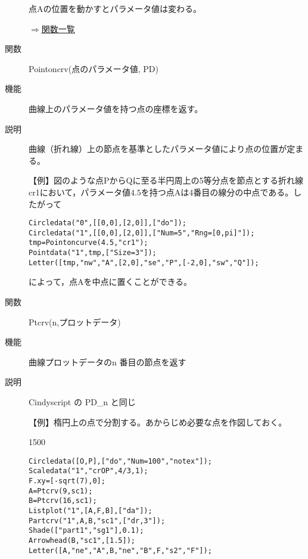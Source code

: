 \documentclass[papersize,a4paper,10pt,uplatex]{jsarticle}
\begin{document}
\begin{description}
点Aの位置を動かすとパラメータ値は変わる。

\vspace{\baselineskip}
\begin{center}
 
\end{center}

\begin{flushright}\hyperlink{functionlist}{$\Rightarrow$関数一覧}\end{flushright}


\vspace{\baselineskip}
\hypertarget{pointoncrv}{}
\item[関数]Pointoncrv(点のパラメータ値, PD)
\item[機能]曲線上のパラメータ値を持つ点の座標を返す。
\item[説明]曲線（折れ線）上の節点を基準としたパラメータ値により点の位置が定まる。

\vspace{\baselineskip}
【例】図のような点$\mathrm{P}$から$\mathrm{Q}$に至る半円周上の5等分点を節点とする折れ線cr1において，パラメータ値$4.5$を持つ点$\mathrm{A}$は4番目の線分の中点である。したがって

\begin{verbatim}
Circledata("0",[[0,0],[2,0]],["do"]);
Circledata("1",[[0,0],[2,0]],["Num=5","Rng=[0,pi]"]);
tmp=Pointoncurve(4.5,"cr1");
Pointdata("1",tmp,["Size=3"]);
Letter([tmp,"nw","A",[2,0],"se","P",[-2,0],"sw","Q"]);
\end{verbatim}

によって，点Aを中点に置くことができる。

\vspace{\baselineskip}
 \begin{center} \scalebox{0.9}{} \end{center}

\hypertarget{ptcrv}{}
\item[関数]Ptcrv(n,プロットデータ)
\item[機能]曲線プロットデータのn 番目の節点を返す
\item[説明]Cindyscript の PD\_n と同じ

\vspace{\baselineskip}
【例】楕円上の点で分割する。あからじめ必要な点を作図しておく。

\begin{layer}{150}{0}
\end{layer}
\begin{verbatim}
Circledata([O,P],["do","Num=100","notex"]);
Scaledata("1","crOP",4/3,1);
F.xy=[-sqrt(7),0];
A=Ptcrv(9,sc1);
B=Ptcrv(16,sc1);
Listplot("1",[A,F,B],["da"]);
Partcrv("1",A,B,"sc1",["dr,3"]);
Shade(["part1","sg1"],0.1);
Arrowhead(B,"sc1",[1.5]);
Letter([A,"ne","A",B,"ne","B",F,"s2","F"]);
\end{verbatim}
 

\end{description}
\end{document}
